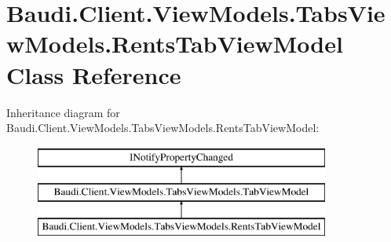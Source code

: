 \hypertarget{class_baudi_1_1_client_1_1_view_models_1_1_tabs_view_models_1_1_rents_tab_view_model}{}\section{Baudi.\+Client.\+View\+Models.\+Tabs\+View\+Models.\+Rents\+Tab\+View\+Model Class Reference}
\label{class_baudi_1_1_client_1_1_view_models_1_1_tabs_view_models_1_1_rents_tab_view_model}
Inheritance diagram for Baudi.\+Client.\+View\+Models.\+Tabs\+View\+Models.\+Rents\+Tab\+View\+Model\+:\begin{figure}[H]
\begin{center}
\leavevmode
\includegraphics[height=3.000000cm]{class_baudi_1_1_client_1_1_view_models_1_1_tabs_view_models_1_1_rents_tab_view_model}
\end{center}
\end{figure}
